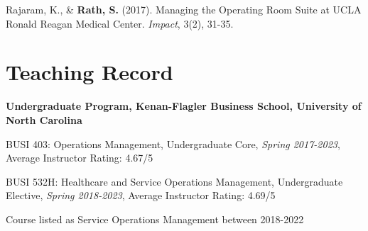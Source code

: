 \documentclass[11pt,a4paper]{article}
\renewenvironment{itemize}{
	\begin{list}{}{
			\setlength{\leftmargin}{1.5em}
		}
	}{
\end{list}
}
\begin{document}
\begin{itemize}
	\item Rajaram, K., \& \textbf{Rath, S.} (2017). Managing the Operating Room Suite at UCLA Ronald Reagan Medical Center. \emph{Impact}, 3(2), 31-35.
\end{itemize}


%


	\section*{\textbf{Teaching Record}}

	\begin{itemize}
		\item\textbf{ Undergraduate Program, Kenan-Flagler Business School, University of North
			Carolina}
		\begin{itemize}
			\item BUSI 403: Operations Management, Undergraduate Core, \emph{Spring 2017-2023}, Average Instructor Rating: 4.67/5

%


			\item BUSI 532H: Healthcare and Service Operations Management, Undergraduate Elective, \emph{Spring 2018-2023}, Average Instructor Rating: 4.69/5
			\begin{itemize}
				\item[\textendash] Course listed as Service Operations Management between 2018-2022
			\end{itemize}
		\end{itemize}

	\end{itemize}
\end{document}
